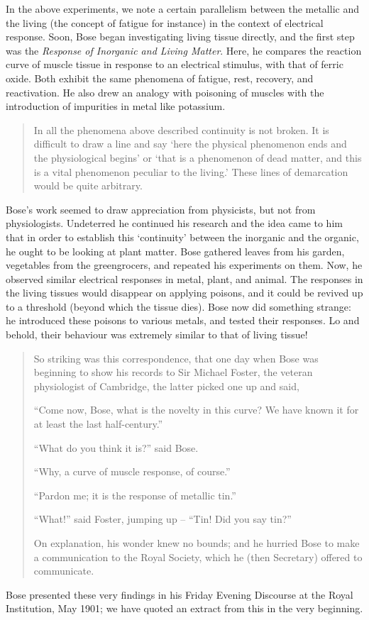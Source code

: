 \documentclass[11pt]{article}
\theoremstyle{remark}
\begin{document}
    In the above experiments, we note a certain parallelism between the metallic and
    the living (the concept of fatigue for instance) in the context of electrical
    response. Soon, Bose began investigating living tissue directly, and the first
    step was the \emph{Response of Inorganic and Living Matter}. Here, he compares
    the reaction curve of muscle tissue in response to an electrical stimulus, with
    that of ferric oxide. Both exhibit the same phenomena of fatigue, rest, recovery,
    and reactivation. He also drew an analogy with poisoning of muscles with the
    introduction of impurities in metal like potassium. 
    \begin{quote}
        In all the phenomena above described continuity is not broken. It is
        difficult to draw a line and say `here the physical phenomenon ends and the
        physiological begins' or `that is a phenomenon of dead matter, and this is a
        vital phenomenon peculiar to the living.' These lines of demarcation would be
        quite arbitrary.
    \end{quote}
    Bose's work seemed to draw appreciation from physicists, but not from physiologists.
    Undeterred he continued his research and the idea came to him that in order to
    establish this `continuity' between the inorganic and the organic, he ought to be
    looking at plant matter. Bose gathered leaves from his garden, vegetables from
    the greengrocers, and repeated his experiments on them. Now, he observed similar
    electrical responses in metal, plant, and animal. The responses in the living
    tissues would disappear on applying poisons, and it could be revived up to a
    threshold (beyond which the tissue dies). Bose now did something strange: he
    introduced these poisons to various metals, and tested their responses. Lo and
    behold, their behaviour was extremely similar to that of living tissue!
    \begin{quote}
        So striking was this correspondence, that one day when Bose was beginning to
        show his records to Sir Michael Foster, the veteran physiologist of
        Cambridge, the latter picked one up and said,

        ``Come now, Bose, what is the novelty in this curve? We have known it for at
        least the last half-century.''

        ``What do you think it is?'' said Bose.

        ``Why, a curve of muscle response, of course.''

        ``Pardon me; it is the response of metallic tin.''

        ``What!'' said Foster, jumping up -- ``Tin! Did you say tin?''

        On explanation, his wonder knew no bounds; and he hurried Bose to make a
        communication to the Royal Society, which he (then Secretary) offered to
        communicate.
    \end{quote}
    Bose presented these very findings in his Friday Evening Discourse at the Royal
    Institution, May 1901; we have quoted an extract from this in the very beginning.
    \\
\end{document}
